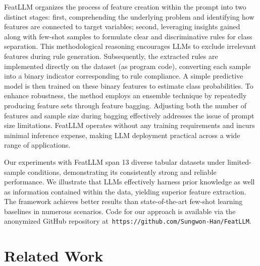 \textsf{FeatLLM} organizes the process of feature creation within the prompt into two distinct stages: first, comprehending the underlying problem and identifying how features are connected to target variables; second, leveraging insights gained along with few-shot samples to formulate clear and discriminative rules for class separation. This methodological reasoning encourages LLMs to exclude irrelevant features during rule generation. Subsequently, the extracted rules are implemented directly on the dataset (as program code), converting each sample into a binary indicator corresponding to rule compliance. A simple predictive model is then trained on these binary features to estimate class probabilities. To enhance robustness, the method employs an ensemble technique by repeatedly producing feature sets through feature bagging. Adjusting both the number of features and sample size during bagging effectively addresses the issue of prompt size limitations. \textsf{FeatLLM} operates without any training requirements and incurs minimal inference expense, making LLM deployment practical across a wide range of applications.

Our experiments with \textsf{FeatLLM} span 13 diverse tabular datasets under limited-sample conditions, demonstrating its consistently strong and reliable performance. We illustrate that LLMs effectively harness prior knowledge as well as information contained within the data, yielding superior feature extraction. The framework achieves better results than state-of-the-art few-shot learning baselines in numerous scenarios. Code for our approach is available via the anonymized GitHub repository at~\texttt{https://github.com/Sungwon-Han/FeatLLM}.

\section{Related Work}

